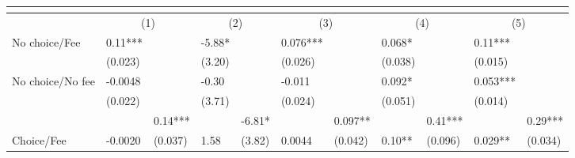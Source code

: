 \begin{tabular}{rrrrrrrrrrr}
\toprule
      & \multicolumn{2}{c}{} & \multicolumn{2}{c}{} & \multicolumn{2}{c}{} & \multicolumn{2}{c}{} & \multicolumn{2}{c}{} \\
\midrule
\midrule
\multicolumn{1}{l}{} & \multicolumn{2}{c}{(1)} & \multicolumn{2}{c}{(2)} & \multicolumn{2}{c}{(3)} & \multicolumn{2}{c}{(4)} & \multicolumn{2}{c}{(5)} \\
\midrule
\midrule
\multicolumn{1}{l}{No choice/Fee} & \multicolumn{1}{l}{0.11***} & \multicolumn{1}{l}{} & \multicolumn{1}{l}{-5.88*} & \multicolumn{1}{l}{} & \multicolumn{1}{l}{0.076***} & \multicolumn{1}{l}{} & \multicolumn{1}{l}{0.068*} & \multicolumn{1}{l}{} & \multicolumn{1}{l}{0.11***} & \multicolumn{1}{l}{} \\
\multicolumn{1}{l}{} & \multicolumn{1}{l}{(0.023)} & \multicolumn{1}{l}{} & \multicolumn{1}{l}{(3.20)} & \multicolumn{1}{l}{} & \multicolumn{1}{l}{(0.026)} & \multicolumn{1}{l}{} & \multicolumn{1}{l}{(0.038)} & \multicolumn{1}{l}{} & \multicolumn{1}{l}{(0.015)} & \multicolumn{1}{l}{} \\
\multicolumn{1}{l}{No choice/No fee} & \multicolumn{1}{l}{-0.0048} & \multicolumn{1}{l}{} & \multicolumn{1}{l}{-0.30} & \multicolumn{1}{l}{} & \multicolumn{1}{l}{-0.011} & \multicolumn{1}{l}{} & \multicolumn{1}{l}{0.092*} & \multicolumn{1}{l}{} & \multicolumn{1}{l}{0.053***} & \multicolumn{1}{l}{} \\
\multicolumn{1}{l}{} & \multicolumn{1}{l}{(0.022)} & \multicolumn{1}{l}{} & \multicolumn{1}{l}{(3.71)} & \multicolumn{1}{l}{} & \multicolumn{1}{l}{(0.024)} & \multicolumn{1}{l}{} & \multicolumn{1}{l}{(0.051)} & \multicolumn{1}{l}{} & \multicolumn{1}{l}{(0.014)} & \multicolumn{1}{l}{} \\
      &       & \multicolumn{1}{l}{\cellcolor[rgb]{ .929,  .929,  .929} 0.14***} &       & \multicolumn{1}{l}{\cellcolor[rgb]{ .929,  .929,  .929} -6.81*} &       & \multicolumn{1}{l}{\cellcolor[rgb]{ .929,  .929,  .929} 0.097**} &       & \multicolumn{1}{l}{\cellcolor[rgb]{ .929,  .929,  .929} 0.41***} &       & \multicolumn{1}{l}{\cellcolor[rgb]{ .929,  .929,  .929} 0.29***} \\
\multicolumn{1}{l}{Choice/Fee} & \multicolumn{1}{l}{-0.0020} & \multicolumn{1}{l}{\cellcolor[rgb]{ .929,  .929,  .929} (0.037)} & \multicolumn{1}{l}{1.58} & \multicolumn{1}{l}{\cellcolor[rgb]{ .929,  .929,  .929} (3.82)} & \multicolumn{1}{l}{0.0044} & \multicolumn{1}{l}{\cellcolor[rgb]{ .929,  .929,  .929} (0.042)} & \multicolumn{1}{l}{0.10**} & \multicolumn{1}{l}{\cellcolor[rgb]{ .929,  .929,  .929} (0.096)} & \multicolumn{1}{l}{0.029**} & \multicolumn{1}{l}{\cellcolor[rgb]{ .929,  .929,  .929} (0.034)} \\

\end{tabular}
